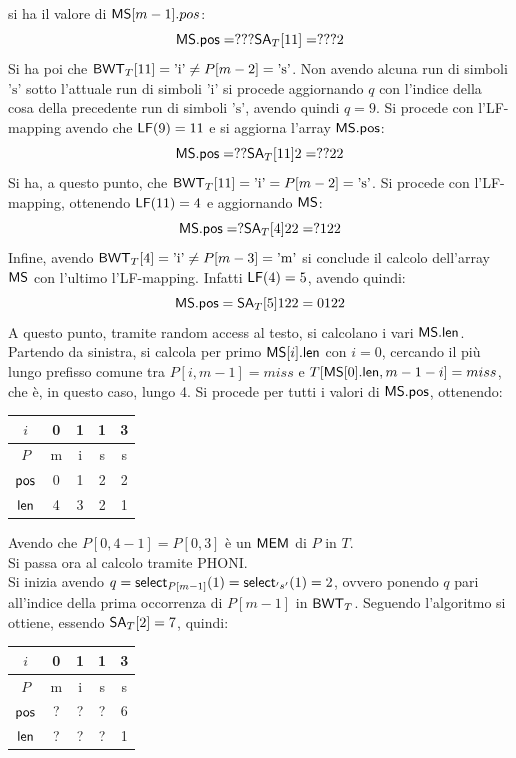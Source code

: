 \begin{esempio}
  si ha il valore di $\mbox{\rm {\sf MS}}[m-1].pos$:
  \[\mbox{\rm {\sf MS}}.\mbox{\rm {\sf pos}} = ???\mbox{\rm {\sf SA}}_T[11]=???2\]
  Si ha poi che $\mbox{\rm {\sf BWT}}_T[11]=\mbox{'i'}\neq P[m-2]=\mbox{'s'}$. Non avendo alcuna
  run di simboli $\mbox{'s'}$ sotto l'attuale run di simboli $\mbox{'i'}$ si
  procede aggiornando $q$ con l'indice della cosa della precedente run di
  simboli $\mbox{'s'}$, avendo quindi $q=9$. Si procede con
  l'LF-mapping avendo che $\mbox{\rm {\sf LF}}(9)=11$ e si aggiorna l'array $\mbox{\rm {\sf MS}}.\mbox{\rm {\sf pos}}$:
  \[\mbox{\rm {\sf MS}}.\mbox{\rm {\sf pos}} = ??\mbox{\rm {\sf SA}}_T[11]2=??22\]
  Si ha, a questo punto, che $\mbox{\rm {\sf BWT}}_T[11]=\mbox{'i'}= P[m-2]=\mbox{'s'}$. Si
  procede con l'LF-mapping, ottenendo $\mbox{\rm {\sf LF}}(11)=4$ e aggiornando $\mbox{\rm {\sf MS}}$:
  \[\mbox{\rm {\sf MS}}.\mbox{\rm {\sf pos}} = ?\mbox{\rm {\sf SA}}_T[4]22=?122\]
  Infine, avendo $\mbox{\rm {\sf BWT}}_T[4]=\mbox{'i'}\neq P[m-3]=\mbox{'m'}$ si conclude il
  calcolo dell'array $\mbox{\rm {\sf MS}}$ con l'ultimo l'LF-mapping. Infatti $\mbox{\rm {\sf LF}}(4)=5$,
  avendo quindi:
  \[\mbox{\rm {\sf MS}}.\mbox{\rm {\sf pos}} = \mbox{\rm {\sf SA}}_T[5]122=0122\]
  A questo punto, tramite random access al testo, si calcolano i vari
  $\mbox{\rm {\sf MS}}.\mbox{\rm {\sf len}}$. Partendo da sinistra, si calcola per primo $\mbox{\rm {\sf MS}}[i].\mbox{\rm {\sf len}}$ con $i=0$,
  cercando il più lungo prefisso comune tra $P[i,m-1]=miss$ e $T[\mbox{\rm {\sf MS}}[0].\mbox{\rm {\sf len}},
  m-1-i]=miss$, che è, in questo caso, lungo 4. Si procede per tutti i valori di
  $\mbox{\rm {\sf MS}}.\mbox{\rm {\sf pos}}$, ottenendo:
  \begin{table}[H]
    \centering
    \begin{tabular}{c||c|c|c|c}
      $i$ & 0 & 1 & 1 & 3 \\
      \hline
      $P$ & m & i & s & s \\
      \hline
      \hline
      $\mbox{\rm {\sf pos}}$ & 0 & 1 & 2 & 2\\
      \hline
      $\mbox{\rm {\sf len}}$ & 4 & 3 & 2 & 1\\
    \end{tabular}
  \end{table}
  Avendo che $P[0,4-1]=P[0,3]$ è un $\mbox{\rm {\sf MEM}}$ di $P$ in $T$.\\
  Si passa ora al calcolo tramite PHONI.\\
  Si inizia avendo $q=\mbox{\rm {\sf select}}_{P[m-1]}(1)=\mbox{\rm {\sf select}}_{'s'}(1)=2$, ovvero ponendo $q$
  pari all'indice della prima occorrenza di $P[m-1]$ in $\mbox{\rm {\sf BWT}}_T$. Seguendo
  l'algoritmo si ottiene, essendo $\mbox{\rm {\sf SA}}_T[2]=7$, quindi:
  \begin{table}[H]
    \centering
    \begin{tabular}{c||c|c|c|c}
      $i$ & 0 & 1 & 1 & 3 \\
      \hline
      $P$ & m & i & s & s \\
      \hline
      \hline
      $\mbox{\rm {\sf pos}}$ & ? & ? & ? & 6\\
      \hline
      $\mbox{\rm {\sf len}}$ & ? & ? & ? & 1\\

\end{tabular}
\end{table}
\end{esempio}
